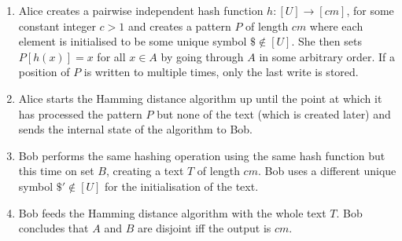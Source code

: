 \documentclass{article}
\theoremstyle{plain}
\theoremstyle{definition}
\begin{document}
\begin{enumerate}
 \item Alice creates a pairwise independent hash function $h:[U]\rightarrow [cm]$, for some constant integer $c>1$ and creates a pattern $P$ of length $cm$ where each element is initialised to be some unique symbol $\$\notin [U]$. She then sets $P[h(x)] = x$ for all $x\in A$ by going through $A$ in some arbitrary order. If a position of $P$ is written to multiple times, only the last write is stored.
 \item Alice starts the Hamming distance algorithm up until the point at which it has processed the pattern $P$ but none of the text (which is created later) and sends the internal state of the algorithm to Bob.
 \item Bob performs the same hashing operation using the same hash function but this time on set $B$, creating a text $T$ of length $cm$. Bob uses a different unique symbol $\$'\notin [U]$ for the initialisation of the text.
 \item Bob feeds the Hamming distance algorithm with the whole text $T$. Bob concludes that $A$ and $B$ are disjoint iff the output is $cm$.
\end{enumerate}
\end{document}
